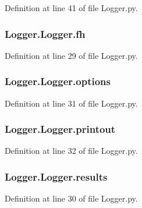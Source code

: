 Definition at line 41 of file Logger.\-py.

\hypertarget{class_logger_1_1_logger_a68875fbff44820c122a69fee38bad238}{
\subsubsection[{fh}]{\setlength{\rightskip}{0pt plus 5cm}Logger.\-Logger.\-fh}}\label{class_logger_1_1_logger_a68875fbff44820c122a69fee38bad238}


Definition at line 29 of file Logger.\-py.

\hypertarget{class_logger_1_1_logger_a8e881dc46a69491fab52e8fca3d8dd59}{
\subsubsection[{options}]{\setlength{\rightskip}{0pt plus 5cm}Logger.\-Logger.\-options}}\label{class_logger_1_1_logger_a8e881dc46a69491fab52e8fca3d8dd59}


Definition at line 31 of file Logger.\-py.

\hypertarget{class_logger_1_1_logger_abd7bd77ec56ae98c25ff4596ae8ee0ea}{
\subsubsection[{printout}]{\setlength{\rightskip}{0pt plus 5cm}Logger.\-Logger.\-printout}}\label{class_logger_1_1_logger_abd7bd77ec56ae98c25ff4596ae8ee0ea}


Definition at line 32 of file Logger.\-py.

\hypertarget{class_logger_1_1_logger_accc7402a4ee718e807f3f60d850d2072}{
\subsubsection[{results}]{\setlength{\rightskip}{0pt plus 5cm}Logger.\-Logger.\-results}}\label{class_logger_1_1_logger_accc7402a4ee718e807f3f60d850d2072}


Definition at line 30 of file Logger.\-py.


